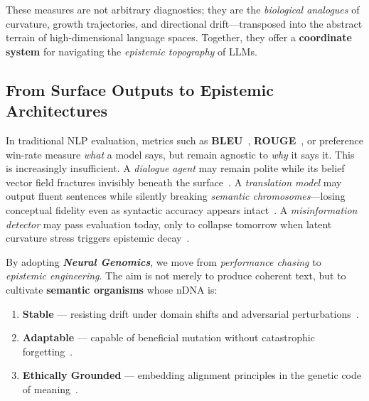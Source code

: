 These measures are not arbitrary diagnostics; they are the \emph{biological analogues} of curvature, growth trajectories, and directional drift—transposed into the abstract terrain of high-dimensional language spaces. Together, they offer a \textbf{coordinate system} for navigating the \emph{epistemic topography} of LLMs.

\subsection*{\textbf{From Surface Outputs to Epistemic Architectures}}
In traditional NLP evaluation, metrics such as \textbf{BLEU}~\cite{papineni2002bleu}, \textbf{ROUGE}~\cite{lin2004rouge}, or preference win-rate measure \emph{what} a model says, but remain agnostic to \emph{why} it says it. This is increasingly insufficient. A \emph{dialogue agent} may remain polite while its belief vector field fractures invisibly beneath the surface~\cite{mehri2020usr, huang2020grade}. A \emph{translation model} may output fluent sentences while silently breaking \emph{semantic chromosomes}—losing conceptual fidelity even as syntactic accuracy appears intact~\cite{koehn2020neural, marie2022scientific}. A \emph{misinformation detector} may pass evaluation today, only to collapse tomorrow when latent curvature stress triggers epistemic decay~\cite{ji2023survey, zellers2019defending}.

By adopting \textbf{\emph{Neural Genomics}}, we move from \emph{performance chasing} to \emph{epistemic engineering}. The aim is not merely to produce coherent text, but to cultivate \textbf{semantic organisms} whose nDNA is:
\begin{enumerate}
    \item \textbf{Stable} — resisting drift under domain shifts and adversarial perturbations~\cite{hendrycks2021many, wang2022adversarial}.
    \item \textbf{Adaptable} — capable of beneficial mutation without catastrophic forgetting~\cite{li2017learning, wang2023comprehensive}.
    \item \textbf{Ethically Grounded} — embedding alignment principles in the genetic code of meaning~\cite{askell2021general, bai2022training}.
\end{enumerate}

